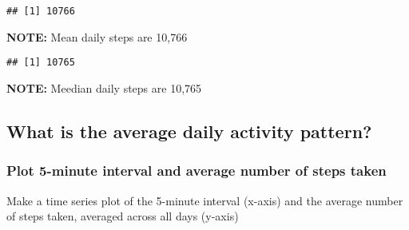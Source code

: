 \documentclass[]{article}
\newenvironment{Shaded}{\begin{snugshade}}{\end{snugshade}}
\newcommand{\CommentTok}[1]{\textcolor[rgb]{0.56,0.35,0.01}{\textit{#1}}}
\newcommand{\DataTypeTok}[1]{\textcolor[rgb]{0.13,0.29,0.53}{#1}}
\newcommand{\KeywordTok}[1]{\textcolor[rgb]{0.13,0.29,0.53}{\textbf{#1}}}
\newcommand{\NormalTok}[1]{#1}
\newcommand{\OperatorTok}[1]{\textcolor[rgb]{0.81,0.36,0.00}{\textbf{#1}}}
\newcommand{\OtherTok}[1]{\textcolor[rgb]{0.56,0.35,0.01}{#1}}
\newcommand{\StringTok}[1]{\textcolor[rgb]{0.31,0.60,0.02}{#1}}
\begin{document}
\begin{Shaded}
\end{Shaded}

\begin{verbatim}
## [1] 10766
\end{verbatim}

\textbf{NOTE:} Mean daily steps are 10,766

\begin{Shaded}
\end{Shaded}

\begin{verbatim}
## [1] 10765
\end{verbatim}

\textbf{NOTE:} Meedian daily steps are 10,765

\hypertarget{what-is-the-average-daily-activity-pattern}{%
\subsection{What is the average daily activity
pattern?}\label{what-is-the-average-daily-activity-pattern}}

\hypertarget{plot-5-minute-interval-and-average-number-of-steps-taken}{%
\subsubsection{Plot 5-minute interval and average number of steps
taken}\label{plot-5-minute-interval-and-average-number-of-steps-taken}}

Make a time series plot of the 5-minute interval (x-axis) and the
average number of steps taken, averaged across all days (y-axis)
\end{document}
